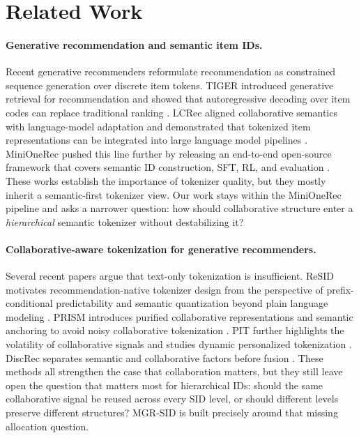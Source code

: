 \section{Related Work}
\label{sec:related}

\paragraph{Generative recommendation and semantic item IDs.}
Recent generative recommenders reformulate recommendation as constrained sequence generation over discrete item tokens. TIGER introduced generative retrieval for recommendation and showed that autoregressive decoding over item codes can replace traditional ranking \citep{rajput2023tiger}. LCRec aligned collaborative semantics with language-model adaptation and demonstrated that tokenized item representations can be integrated into large language model pipelines \citep{zheng2023lcrec}. MiniOneRec pushed this line further by releasing an end-to-end open-source framework that covers semantic ID construction, SFT, RL, and evaluation \citep{kong2025minionerec}. These works establish the importance of tokenizer quality, but they mostly inherit a semantic-first tokenizer view. Our work stays within the MiniOneRec pipeline and asks a narrower question: how should collaborative structure enter a \emph{hierarchical} semantic tokenizer without destabilizing it?

\paragraph{Collaborative-aware tokenization for generative recommenders.}
Several recent papers argue that text-only tokenization is insufficient. ReSID motivates recommendation-native tokenizer design from the perspective of prefix-conditional predictability and semantic quantization beyond plain language modeling \citep{liang2026resid}. PRISM introduces purified collaborative representations and semantic anchoring to avoid noisy collaborative tokenization \citep{fang2026prism}. PIT further highlights the volatility of collaborative signals and studies dynamic personalized tokenization \citep{wang2026pit}. DiscRec separates semantic and collaborative factors before fusion \citep{liu2025discrec}. These methods all strengthen the case that collaboration matters, but they still leave open the question that matters most for hierarchical IDs: should the same collaborative signal be reused across every SID level, or should different levels preserve different structures? MGR-SID is built precisely around that missing allocation question.

